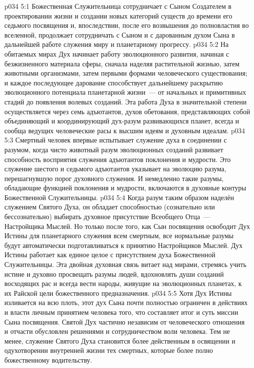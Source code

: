 \vs p034 5:1 Божественная Служительница сотрудничает с Сыном Создателем в проектировании жизни и создании новых категорий существ до времени его седьмого посвящения и, впоследствии, после его возвышения до полновластия во вселенной, продолжает сотрудничать с Сыном и с дарованным духом Сына в дальнейшей работе служения миру и планетарному прогрессу.
\vs p034 5:2 На обитаемых мирах Дух начинает работу эволюционного развития, начиная с безжизненного материала сферы, сначала наделяя растительной жизнью, затем животными организмами, затем первыми формами человеческого существования; и каждое последующее дарование способствует дальнейшему раскрытию эволюционного потенциала планетарной жизни~--- от начальных и примитивных стадий до появления волевых созданий. Эта работа Духа в значительной степени осуществляется через семь адъютантов, духов обетования, представляющих собой объединяющий и координирующий дух\hyp{}разум развивающихся планет, всегда и сообща ведущих человеческие расы к высшим идеям и духовным идеалам.
\vs p034 5:3 \pc Смертный человек впервые испытывает служение духа в соединении с разумом, когда чисто животный разум эволюционных созданий развивает способность восприятия служения адъютантов поклонения и мудрости. Это служение шестого и седьмого адъютантов указывает на эволюцию разума, перешагнувшую порог духовного служения. И немедленно такие разумы, обладающие функцией поклонения и мудрости, включаются в духовные контуры Божественной Служительницы.
\vs p034 5:4 Когда разум таким образом наделён служением Святого Духа, он обладает способностью (сознательно или бессознательно) выбирать духовное присутствие Всеобщего Отца~--- Настройщика Мыслей. Но только после того, как Сын посвящения освободит Дух Истины для планетарного служения всем смертным, все нормальные разумы будут автоматически подготавливаться к принятию Настройщиков Мыслей. Дух Истины работает как единое целое с присутствием духа Божественной Служительницы. Эта двойная духовная связь витает над мирами, стремясь учить истине и духовно просвещать разумы людей, вдохновлять души созданий восходящих рас и всегда вести народы, живущие на эволюционных планетах, к их Райской цели божественного предназначения.
\vs p034 5:5 Хотя Дух Истины изливается на всю плоть, этот дух Сына почти полностью ограничен в действиях и власти личным принятием человека того, что составляет итог и суть миссии Сына посвящения. Святой Дух частично независим от человеческого отношения и отчасти обусловлен решениями и сотрудничеством воли человека. Тем не менее, служение Святого Духа становится более действенным в освящении и одухотворении внутренней жизни тех смертных, которые более полно  божественному водительству.
